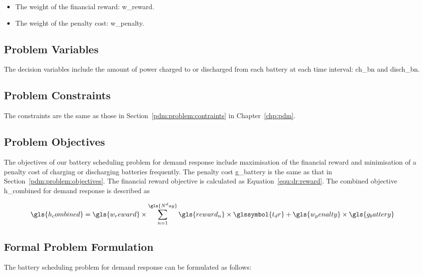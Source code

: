 \begin{itemize}
	\item The weight of the financial reward: \gls{w_reward}.
	
	\item The weight of the penalty cost: \gls{w_penalty}.
\end{itemize}


\subsection{Problem Variables}

The decision variables include the amount of power charged to or discharged from each battery at each time interval: \gls{ch_bn} and \gls{disch_bn}.


\subsection{Problem Constraints}

The constraints are the same as those in Section~\ref{pdm:problem:contraints} in Chapter~\ref{chp:pdm}.

\subsection{Problem Objectives}

The objectives of our battery scheduling problem for demand response include maximisation of the financial reward and minimisation of a penalty cost of charging or discharging batteries frequently. The penalty cost \gls{g_battery} is the same as that in Section~\ref{pdm:problem:objectives}. The financial reward objective is calculated as Equation~\ref{equ:dr:reward}. The combined objective \gls{h_combined} for demand response is described as

\begin{equation}
	\label{dr:problem:obj}
	\gls{h_combined} = \gls{w_reward} \times \sum_{n=1}^{\gls{N^day}} \gls{reward_n} \times \glssymbol{t_dr} + \gls{w_penalty} \times \gls{g_battery}
\end{equation}


\subsection{Formal Problem Formulation}

The battery scheduling problem for demand response can be formulated as follows:

